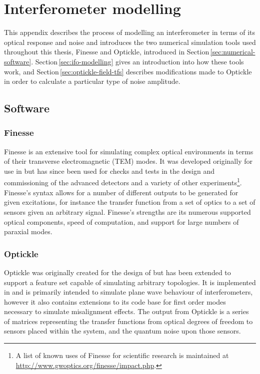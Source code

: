 \chapter{\label{a:simulation-tools}Interferometer modelling}
This appendix describes the process of modelling an interferometer in terms of its optical response and noise and introduces the two numerical simulation tools used throughout this thesis, Finesse and Optickle, introduced in Section\,\ref{sec:numerical-software}. Section\,\ref{sec:ifo-modelling} gives an introduction into how these tools work, and Section\,\ref{sec:optickle-field-tfs} describes modifications made to Optickle in order to calculate a particular type of noise amplitude.

\section{\label{sec:numerical-software}Software}
\subsection{\label{sec:finesse-sim}Finesse}
Finesse is an extensive tool for simulating complex optical environments in terms of their transverse electromagnetic (\gls{TEM}) modes. It was developed originally for use in \GEO{} \cite{Freise2004} but has since been used for checks and tests in the design and commissioning of the advanced detectors \cite{Mueller2015, Kumeta2015} and a variety of other experiments\footnote{A list of known uses of Finesse for scientific research is maintained at \url{http://www.gwoptics.org/finesse/impact.php}.}. Finesse's syntax allows for a number of different outputs to be generated for given excitations, for instance the transfer function from a set of optics to a set of sensors given an arbitrary signal. Finesse's strengths are its numerous supported optical components, speed of computation, and support for large numbers of paraxial modes.

\subsection{\label{sec:optickle-sim}Optickle}
Optickle was originally created for the design of \ALIGO{} but has been extended to support a feature set capable of simulating arbitrary topologies. It is implemented in \MATLAB{} and is primarily intended to simulate plane wave behaviour of interferometers, however it also contains extensions to its code base for first order modes necessary to simulate misalignment effects. The output from Optickle is a series of matrices representing the transfer functions from optical degrees of freedom to sensors placed within the system, and the quantum noise upon those sensors.

